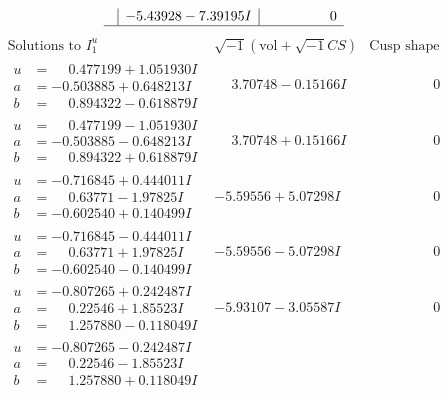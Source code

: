 \documentclass[1p]{elsarticle_modified}
\theoremstyle{definition}
\newcommand{\I}{\sqrt{-1}}
\begin{document}
$$\begin{array}{c|c|c}
 & -5.43928 - 7.39195 I & \phantom{-0.000000 } 0\\
 \hline 
 \end{array}$$\newpage$$\begin{array}{c|c|c}  
\text{Solutions to }I^u_{1}& \I (\text{vol} + \sqrt{-1}CS) & \text{Cusp shape}\\
 \hline 
\begin{aligned}
u &= \phantom{-}0.477199 + 1.051930 I \\
a &= -0.503885 + 0.648213 I \\
b &= \phantom{-}0.894322 - 0.618879 I\end{aligned}
 & \phantom{-}3.70748 - 0.15166 I & \phantom{-0.000000 } 0 \\ \hline\begin{aligned}
u &= \phantom{-}0.477199 - 1.051930 I \\
a &= -0.503885 - 0.648213 I \\
b &= \phantom{-}0.894322 + 0.618879 I\end{aligned}
 & \phantom{-}3.70748 + 0.15166 I & \phantom{-0.000000 } 0 \\ \hline\begin{aligned}
u &= -0.716845 + 0.444011 I \\
a &= \phantom{-}0.63771 - 1.97825 I \\
b &= -0.602540 + 0.140499 I\end{aligned}
 & -5.59556 + 5.07298 I & \phantom{-0.000000 } 0 \\ \hline\begin{aligned}
u &= -0.716845 - 0.444011 I \\
a &= \phantom{-}0.63771 + 1.97825 I \\
b &= -0.602540 - 0.140499 I\end{aligned}
 & -5.59556 - 5.07298 I & \phantom{-0.000000 } 0 \\ \hline\begin{aligned}
u &= -0.807265 + 0.242487 I \\
a &= \phantom{-}0.22546 + 1.85523 I \\
b &= \phantom{-}1.257880 - 0.118049 I\end{aligned}
 & -5.93107 - 3.05587 I & \phantom{-0.000000 } 0 \\ \hline\begin{aligned}
u &= -0.807265 - 0.242487 I \\
a &= \phantom{-}0.22546 - 1.85523 I \\
b &= \phantom{-}1.257880 + 0.118049 I\end{aligned}

\end{array}$$
\end{document}
